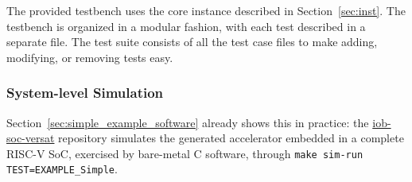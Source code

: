 %

The provided testbench uses the core instance described in
Section~\ref{sec:inst}. The testbench is organized in a modular fashion,
with each test described in a separate file. The test suite consists of
all the test case files to make adding, modifying, or removing tests easy.



\subsubsection*{System-level Simulation}

Section~\ref{sec:simple_example_software} already shows this in practice: the \href{https://github.com/IObundle/iob-soc-versat}{iob-soc-versat} repository simulates the generated accelerator embedded in a complete RISC-V SoC, exercised by bare-metal C software, through \texttt{make sim-run TEST=EXAMPLE\_Simple}.
